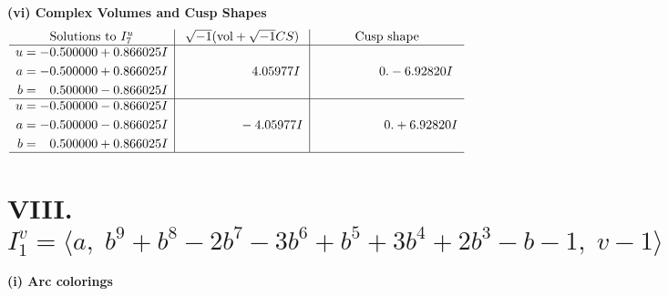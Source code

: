 \documentclass[1p]{elsarticle_modified}
\theoremstyle{definition}
\newcommand{\I}{\sqrt{-1}}
\begin{document}
\newpage\flushleft \textbf{(vi) Complex Volumes and Cusp Shapes}
$$\begin{array}{c|c|c}  
\text{Solutions to }I^u_{7}& \I (\text{vol} + \sqrt{-1}CS) & \text{Cusp shape}\\
 \hline 
\begin{aligned}
u &= -0.500000 + 0.866025 I \\
a &= -0.500000 + 0.866025 I \\
b &= \phantom{-}0.500000 - 0.866025 I\end{aligned}
 & \phantom{-0.000000 -}4.05977 I & \phantom{-0.000000 } 0. - 6.92820 I \\ \hline\begin{aligned}
u &= -0.500000 - 0.866025 I \\
a &= -0.500000 - 0.866025 I \\
b &= \phantom{-}0.500000 + 0.866025 I\end{aligned}
 & \phantom{-0.000000 } -4.05977 I & \phantom{-0.000000 -}0. + 6.92820 I\\
 \hline 
 \end{array}$$\newpage\newpage\renewcommand{\arraystretch}{1}
\centering \section*{VIII. $I^v_{1}= \langle a,\;b^9+b^8-2 b^7-3 b^6+b^5+3 b^4+2 b^3- b-1,\;v-1 \rangle$}
\flushleft \textbf{(i) Arc colorings}\\
\end{document}
